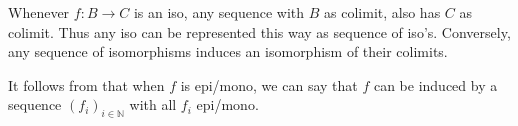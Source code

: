 \begin{remark}\label{rmkIsoEpiMonoMapColimit}
  Whenever $f:B \to C$ is an iso, any sequence with $B$ as colimit, also has $C$ as colimit. 
  Thus any iso can be represented this way as sequence of iso's. 
  Conversely, any sequence of isomorphisms induces an isomorphism of their colimits. 

  It follows from  that when $f$ is epi/mono, 
  we can say that $f$ can be induced by a sequence 
  $(f_i)_{i\in \mathbb N}$ with all $f_i$ epi/mono. 
\end{remark}



